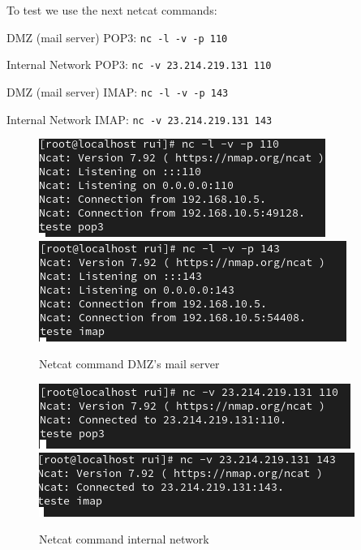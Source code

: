 \documentclass{article}
\begin{document}
To test we use the next netcat commands:
\texttt{}\par
\texttt{}\par
DMZ (mail server) POP3: \texttt{nc -l -v -p 110} \par
Internal Network POP3: \texttt{nc -v 23.214.219.131 110} \par
\texttt{}\par
\texttt{}\par
DMZ (mail server) IMAP: \texttt{nc -l -v -p 143} \par
Internal Network IMAP: \texttt{nc -v 23.214.219.131 143} \par
\texttt{}\par
\begin{figure}[H]
    \centering
    \includegraphics[scale=0.5]{btw/btw_pop3_dmz.png}
    \includegraphics[scale=0.5]{btw/btw_imap_dmz.png}
    \caption{Netcat command DMZ's mail server}
    \label{fig:network-arc}
\end{figure}

\begin{figure}[H]
    \centering
    \includegraphics[scale=0.5]{btw/btw_pop3_internal.png}
    \includegraphics[scale=0.5]{btw/btw_imap_internal.png}
    \caption{Netcat command internal network}
    \label{fig:network-arc}
\end{figure}
\end{document}
